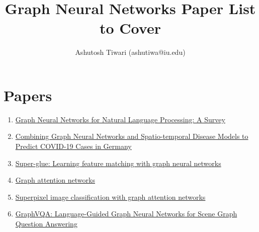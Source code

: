 \documentclass{article}
\title{\textbf{Graph Neural Networks Paper List to Cover}}
\author{{Ashutosh Tiwari (ashutiwa@iu.edu)}}
\begin{document}
\maketitle

\section{Papers}
\begin{enumerate}
    \item \href{https://arxiv.org/pdf/2106.06090.pdf}{Graph Neural Networks for Natural Language Processing: A Survey}
    \item \href{https://arxiv.org/pdf/2101.00661.pdf}{Combining Graph Neural Networks and Spatio-temporal Disease Models to Predict COVID-19 Cases in Germany}
    \item \href{https://arxiv.org/pdf/1911.11763.pdf}{Super-glue: Learning feature matching with graph neural networks}
    \item \href{https://arxiv.org/pdf/1710.10903.pdf}{Graph attention networks}
    \item \href{https://arxiv.org/pdf/2002.05544.pdf}{Superpixel image classification with graph attention networks}
    \item \href{https://arxiv.org/pdf/2104.10283.pdf}{GraphVQA: Language-Guided Graph Neural Networks for Scene Graph Question Answering}

\end{enumerate}


\begin{enumerate}
\end{enumerate}
\end{document}
